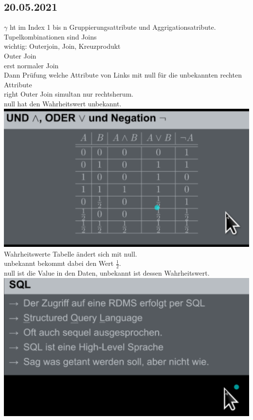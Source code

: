 \documentclass{article}
\begin{document}
	\subsection*{20.05.2021}
	$\gamma$ ht im Index 1 bis n Gruppierungsattribute und Aggrigationsatribute. \\
	Tupelkombinationen sind Joins \\
	wichtig: Outerjoin, Join, Kreuzprodukt \\
	Outer Join \\
	erst normaler Join \\
	Dann Prüfung welche Attribute von Links mit null für die unbekannten rechten Attribute \\
	right Outer Join simultan nur rechtsherum. \\
	null hat den Wahrheitswert unbekannt. \\
	\includegraphics[width=\linewidth]{newtab} \\
	Wahrheitswerte Tabelle ändert sich mit null. \\
	unbekannt bekommt dabei den Wert $\frac{1}{2}$. \\
	null ist die Value in den Daten, unbekannt ist dessen Wahrheitswert. \\
	\includegraphics[width=\linewidth]{sql}
\end{document}
